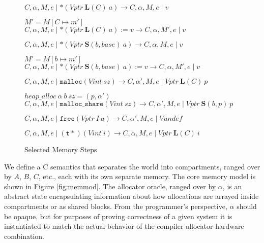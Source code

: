 \documentclass{article}
\begin{document}
\begin{figure}

           {\(C,\alpha,M,e \mid *(\mathit{Vptr} ~ \mathbf{L}(C) ~ a)
             \longrightarrow C,\alpha,M,e \mid v\)}

              {\(M' = M[C \mapsto m']\)}
              {\(C,\alpha,M,e \mid *(\mathit{Vptr} ~ \mathbf{L}(C) ~ a) := v
                \longrightarrow C,\alpha,M',e \mid v\)}

           {\(C,\alpha,M,e \mid *(\mathit{Vptr} ~ \mathbf{S}(b, \mathit{base}) ~ a)
             \longrightarrow C,\alpha,M,e \mid v\)}

              {\(M' = M[b \mapsto m']\)}
              {\(C,\alpha,M,e \mid *(\mathit{Vptr} ~ \mathbf{S}(b, \mathit{base}) ~ a) := v
                \longrightarrow C,\alpha,M',e \mid v\)}

           {\(C,\alpha,M,e\mid \mathtt{malloc}(\mathit{Vint} ~ sz) \longrightarrow
             C,\alpha',M,e \mid \mathit{Vptr} ~ \mathbf{L}(C) ~ p\)}

              {\(\mathit{heap\_alloc} ~ \alpha ~ b ~ sz = (p, \alpha')\)}
              {\(C,\alpha,M,e \mid \mathtt{malloc\_share}(\mathit{Vint} ~ sz) \longrightarrow C,\alpha',M,e \mid \mathit{Vptr} ~ \mathbf{S}(b,p) ~ p\)}

           {\(C,\alpha,M,e \mid \mathtt{free}(\mathit{Vptr} ~ I ~ a) \longrightarrow
             C,\alpha',M,e \mid \mathit{Vundef}\)}

  \judgment[CastIntegerPointer]
           {}
           {\(C,\alpha,M,e \mid \mathtt{(t*)} (\mathit{Vint} ~ i) \longrightarrow
             C,\alpha,M,e \mid \mathit{Vptr} ~ \mathbf{L}(C) ~ \mathit{i}\)}

  \caption{Selected Memory Steps}
  \label{subfig:steps}
\end{figure}

We define a C semantics that separates the world into compartments, ranged over by
\(A\), \(B\), \(C\), etc., each with its own separate memory. The core memory model
is shown in Figure \ref{fig:memmod}. The allocator oracle, ranged over by \(\alpha\),
is an abstract state encapsulating information about how allocations
are arrayed inside compartments or as shared blocks. From the programmer's
perspective, \(\alpha\) should be opaque, but for purposes of proving correctness
of a given system it is instantiated to match the actual behavior of the
compiler-allocator-hardware combination. 
\end{document}
